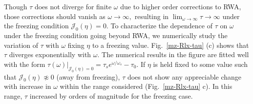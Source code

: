 \documentclass[reprint,preprintnumbers,showpacs,amsmath,twocolumn,showkeys,aps,prl]{revtex4-1}
\begin{document}
Though $\tau$ does not diverge for finite $\omega$ due to higher order corrections to 
RWA, those corrections should vanish as $\omega \to \infty,$ 
resulting in $\lim_{\omega\to\infty}\tau\to\infty$
under the freezing condition ${\mathcal J}_{0}(\eta)=0.$ To characterize the dependence of $\tau$ on $\omega$ 
under the freezing condition going beyond RWA, 
we numerically study the variation of $\tau$ with $\omega$ fixing $\eta$ to a freezing value. 
Fig.~\ref{mz-Rlx-tau} (c) shows that $\tau$  
diverges exponentially with $\omega$. The numerical results in the figure are  
fitted well with the form $\tau(\omega)\bigr|_{{\mathcal J}_{0}(\eta)=0} =  \tau_{s}e^{{\omega}/{\omega_{s}}}-\tau_0$. 
If $\eta$ is held fixed to some value such that ${\mathcal J}_{0}(\eta) \not\approx 0$ (away from freezing), $\tau$ does not show
any appreciable change with increase in $\omega$ within the range considered (Fig.~\ref{mz-Rlx-tau} c). In this range,
$\tau$ increased by orders of magnitude for the freezing case. \\
\end{document}
